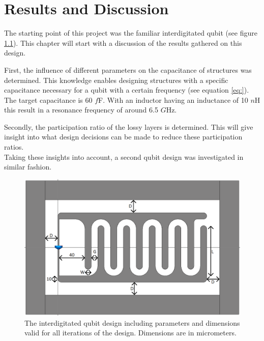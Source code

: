 \chapter{Results and Discussion}
The starting point of this project was the familiar interdigitated qubit (see figure \ref{fig:Yale_parameters2}). This chapter will start with a discussion of the results gathered on this design.


First, the influence of different parameters on the capacitance of structures was determined. This knowledge enables designing structures with a specific capacitance necessary for a qubit with a certain frequency (see equation \eqref{eq:}). The target capacitance is 60 \(f\)F. With an inductor having an inductance of 10 \(n\)H this result in a resonance frequency of around 6.5 \(G\)Hz. 


Secondly, the participation ratio of the lossy layers is determined. This will give insight into what design decisions can be made to reduce these participation ratios.\\
Taking these insights into account, a second qubit design was investigated in similar fashion. 

\vfill

\begin{figure}[h]
	\centering
	\includegraphics[scale = .4]{Figures/Yale_parameters2_cropped}
	\caption{The interdigitated qubit design including parameters and dimensions valid for all iterations of the design. Dimensions are in micrometers.}
	\label{fig:Yale_parameters2}
\end{figure}

